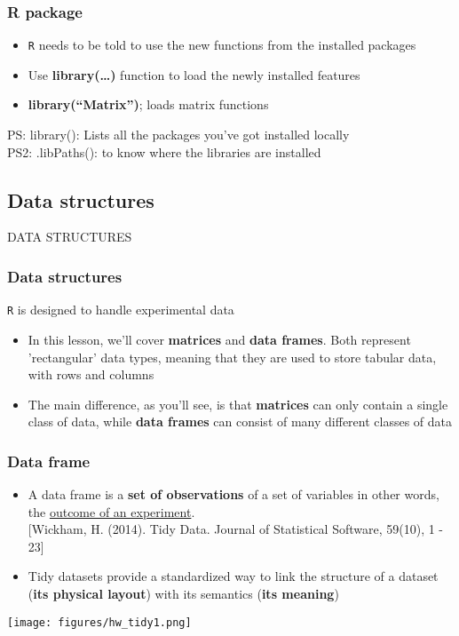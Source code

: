\documentclass{beamer}
\begin{document}
\begin{frame}[fragile]
	\frametitle{R package}
	\begin{itemize}
	\small
		\item \texttt{R} needs to be told to use the new functions from the installed packages 
		\item Use \textbf{library(\ldots)} function to load the newly installed features
		\item \textbf{library(``Matrix'')};  loads matrix functions
	\end{itemize}
	\footnotesize PS: library(): Lists all the packages you've got installed locally\\
	PS2: .libPaths(): to know where the libraries are installed
\end{frame}


\subsection{Data structures}
\begin{frame}
	\centering \Large {\sc DATA STRUCTURES}
\end{frame}


\begin{frame}[fragile]
	\frametitle{Data structures}
	\centering \LARGE \texttt{R} is designed to handle experimental data
	\begin{itemize}
		\small
		\item In this lesson, we'll cover \textbf{matrices} and \textbf{data frames}. Both represent 'rectangular' data types, meaning that they are used to store tabular data, with rows and columns
		\item The main difference, as you'll see, is that \textbf{matrices} can only contain a single class of data, while \textbf{data frames} can consist of many different classes of data
	\end{itemize}
\end{frame}

\begin{frame}[fragile]
	\frametitle{Data frame}
	\begin{itemize}
		\small
		\item A data frame is a \textbf{set of observations} of a set of variables  in other words, the \underline{outcome of an experiment}.\\ 
			\tiny [Wickham, H. (2014). Tidy Data. Journal of Statistical Software, 59(10), 1 - 23] 
\pause
	\small
	\item Tidy datasets provide a standardized way to link the structure of a dataset (\textbf{its physical layout}) with its semantics (\textbf{its meaning})	
	\end{itemize}
	\begin{center} \texttt{[image: figures/hw\_tidy1.png]} \end{center}
 
\end{frame}
\end{document}
